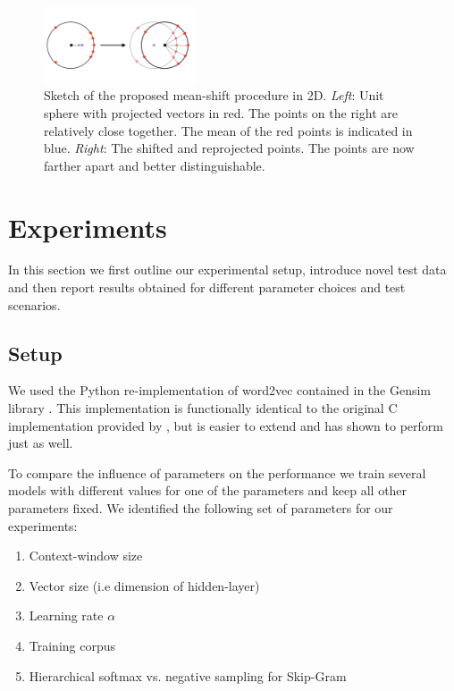 \documentclass[conference]{IEEEtran}
\begin{document}
\begin{figure}[h]
\centering
\includegraphics[width=0.4\textwidth]{recenter}
\caption{Sketch of the proposed mean-shift procedure in 2D. \textit{Left}: Unit sphere with projected vectors in red. The points on the right are relatively close together. The mean of the red points is indicated in blue. \textit{Right}: The shifted and reprojected points. The points are now farther apart and better distinguishable.}
\label{fig:rc}
\end{figure}



\section{Experiments}
\label{sec:exp}

In this section we first outline our experimental setup, introduce novel test data
 and then report results obtained for different parameter choices and test scenarios. 

\subsection{Setup}
We used the Python re-implementation of word2vec contained in the Gensim library 
\cite{rehurek_lrec}. This implementation is functionally identical to the original 
C implementation provided by \cite{mikolov2013efficient}, but is easier to extend and has 
shown to perform just as well. 

To compare the influence of parameters on the performance we train several models
with different values for one of the parameters and keep all other parameters fixed. We 
identified the following set of parameters for our experiments:
\begin{enumerate}
\item Context-window size
\item Vector size (i.e dimension of hidden-layer)
\item Learning rate $\alpha$
\item Training corpus
\item Hierarchical softmax vs. negative sampling for Skip-Gram
\end{enumerate}
\end{document}
